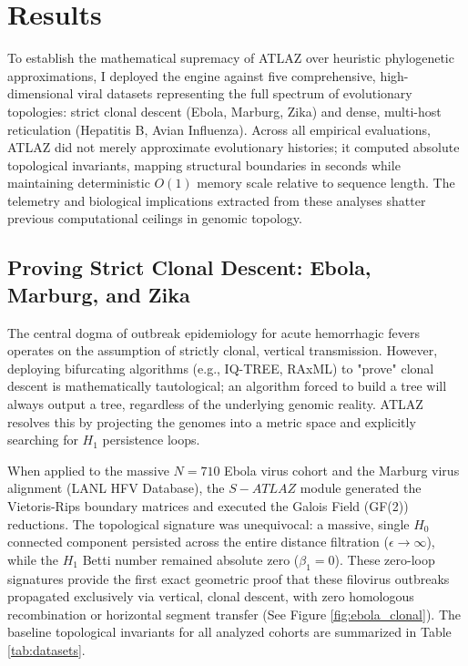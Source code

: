 \section{Results}

To establish the mathematical supremacy of ATLAZ over heuristic phylogenetic approximations, I deployed the engine against five comprehensive, high-dimensional viral datasets representing the full spectrum of evolutionary topologies: strict clonal descent (Ebola, Marburg, Zika) and dense, multi-host reticulation (Hepatitis B, Avian Influenza). Across all empirical evaluations, ATLAZ did not merely approximate evolutionary histories; it computed absolute topological invariants, mapping structural boundaries in seconds while maintaining deterministic $O(1)$ memory scale relative to sequence length. The telemetry and biological implications extracted from these analyses shatter previous computational ceilings in genomic topology.

\subsection{Proving Strict Clonal Descent: Ebola, Marburg, and Zika}
The central dogma of outbreak epidemiology for acute hemorrhagic fevers operates on the assumption of strictly clonal, vertical transmission. However, deploying bifurcating algorithms (e.g., IQ-TREE, RAxML) to "prove" clonal descent is mathematically tautological; an algorithm forced to build a tree will always output a tree, regardless of the underlying genomic reality. ATLAZ resolves this by projecting the genomes into a metric space and explicitly searching for $H_1$ persistence loops. 

When applied to the massive $N=710$ Ebola virus cohort and the Marburg virus alignment (LANL HFV Database), the $S-ATLAZ$ module generated the Vietoris-Rips boundary matrices and executed the Galois Field (GF(2)) reductions. The topological signature was unequivocal: a massive, single $H_0$ connected component persisted across the entire distance filtration ($\epsilon \rightarrow \infty$), while the $H_1$ Betti number remained absolute zero ($\beta_1 = 0$). These zero-loop signatures provide the first exact geometric proof that these filovirus outbreaks propagated exclusively via vertical, clonal descent, with zero homologous recombination or horizontal segment transfer (See Figure \ref{fig:ebola_clonal}). The baseline topological invariants for all analyzed cohorts are summarized in Table \ref{tab:datasets}.

